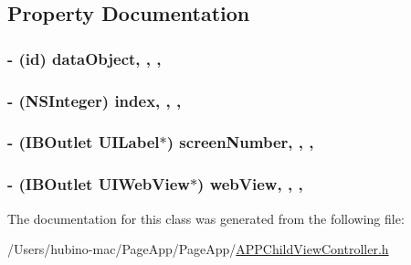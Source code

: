 \subsection{Property Documentation}
\hypertarget{interface_a_p_p_child_view_controller_a45d2bf0ae541d2145028922b6076cdf5}{
\subsubsection[{data\+Object}]{\setlength{\rightskip}{0pt plus 5cm}-\/ (id) data\+Object\hspace{0.3cm}{\ttfamily [read]}, {\ttfamily [write]}, {\ttfamily [nonatomic]}, {\ttfamily [strong]}}}\label{interface_a_p_p_child_view_controller_a45d2bf0ae541d2145028922b6076cdf5}
\hypertarget{interface_a_p_p_child_view_controller_accecfd9572f912f5ca9e35236521d49a}{
\subsubsection[{index}]{\setlength{\rightskip}{0pt plus 5cm}-\/ (N\+S\+Integer) index\hspace{0.3cm}{\ttfamily [read]}, {\ttfamily [write]}, {\ttfamily [nonatomic]}, {\ttfamily [assign]}}}\label{interface_a_p_p_child_view_controller_accecfd9572f912f5ca9e35236521d49a}
\hypertarget{interface_a_p_p_child_view_controller_acb441c535672227c1f1f0ab06d2ab9fe}{
\subsubsection[{screen\+Number}]{\setlength{\rightskip}{0pt plus 5cm}-\/ (I\+B\+Outlet U\+I\+Label$\ast$) screen\+Number\hspace{0.3cm}{\ttfamily [read]}, {\ttfamily [write]}, {\ttfamily [nonatomic]}, {\ttfamily [strong]}}}\label{interface_a_p_p_child_view_controller_acb441c535672227c1f1f0ab06d2ab9fe}
\hypertarget{interface_a_p_p_child_view_controller_a1f5838da40857d637ed5a6cf412910f8}{
\subsubsection[{web\+View}]{\setlength{\rightskip}{0pt plus 5cm}-\/ (I\+B\+Outlet U\+I\+Web\+View$\ast$) web\+View\hspace{0.3cm}{\ttfamily [read]}, {\ttfamily [write]}, {\ttfamily [nonatomic]}, {\ttfamily [strong]}}}\label{interface_a_p_p_child_view_controller_a1f5838da40857d637ed5a6cf412910f8}


The documentation for this class was generated from the following file\+:\begin{DoxyCompactItemize}
\item 
/\+Users/hubino-\/mac/\+Page\+App/\+Page\+App/\hyperlink{_a_p_p_child_view_controller_8h}{A\+P\+P\+Child\+View\+Controller.\+h}\end{DoxyCompactItemize}
